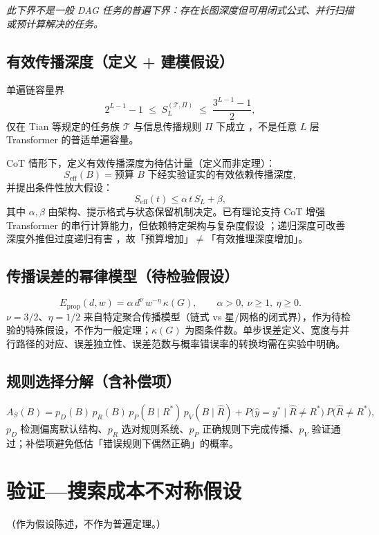 \documentclass[11pt]{ctexart}
\begin{document}
\textit{此下界不是一般 DAG 任务的普遍下界：存在长图深度但可用闭式公式、并行扫描或预计算解决的任务。}

\subsection{有效传播深度（定义 + 建模假设）}

单遍链容量界
\[
  2^{L-1}-1 \;\le\; S_L^{(\mathcal{T},\Pi)} \;\le\; \frac{3^{L-1}-1}{2},
\]
仅在 Tian 等规定的任务族 $\mathcal{T}$ 与信息传播规则 $\Pi$ 下成立 \cite{tian}，不是任意 $L$ 层 Transformer 的普适单遍容量。

CoT 情形下，定义有效传播深度为待估计量（定义而非定理）：
\[
  S_{\mathrm{eff}}(B) = \text{预算 $B$ 下经实验证实的有效依赖传播深度},
\]
并提出条件性放大假设：
\[
  S_{\mathrm{eff}}(t) \le \alpha\, t\, S_L + \beta,
\]
其中 $\alpha,\beta$ 由架构、提示格式与状态保留机制决定。已有理论支持 CoT 增强 Transformer 的串行计算能力，但依赖特定架构与复杂度假设 \cite{cotexpressive,cotserial}；递归深度可改善深度外推但过度递归有害 \cite{loopthink}，故「预算增加」$\neq$「有效推理深度增加」。

\subsection{传播误差的幂律模型（待检验假设）}
\[
  E_{\mathrm{prop}}(d,w) = \alpha\, d^{\nu}\, w^{-\eta}\, \kappa(G),
  \qquad
  \alpha>0,\ \nu\ge 1,\ \eta\ge 0.
\]
$\nu=3/2$、$\eta=1/2$ 来自特定聚合传播模型（链式 vs 星/网格的闭式界），作为待检验的特殊假设，不作为一般定理；$\kappa(G)$ 为图条件数。单步误差定义、宽度与并行路径的对应、误差独立性、误差范数与概率错误率的转换均需在实验中明确。

\subsection{规则选择分解（含补偿项）}
\[
  A_S(B)
  =
  p_D(B)\, p_R(B)\, p_P(B\mid R^*)\, p_V(B\mid \hat R)
  +
  P\!\big(\hat y = y^* \mid \hat R \ne R^*\big)\, P\!\big(\hat R \ne R^*\big),
\]
$p_D$ 检测偏离默认结构、$p_R$ 选对规则系统、$p_P$ 正确规则下完成传播、$p_V$ 验证通过；补偿项避免低估「错误规则下偶然正确」的概率。

\section{验证—搜索成本不对称假设}

（作为假设陈述，不作为普遍定理。）
\end{document}
